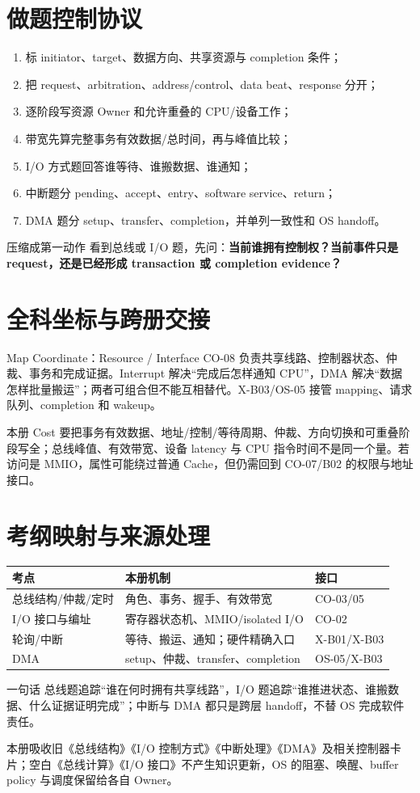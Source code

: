 \documentclass[UTF8,fontset=fandol,11pt,a4paper]{ctexart}
\newcommand{\kw}[1]{\textbf{\color{deep}#1}}
\begin{document}
\section{做题控制协议}
\begin{enumerate}
\item 标 initiator、target、数据方向、共享资源与 completion 条件；
\item 把 request、arbitration、address/control、data beat、response 分开；
\item 逐阶段写资源 Owner 和允许重叠的 CPU/设备工作；
\item 带宽先算完整事务有效数据/总时间，再与峰值比较；
\item I/O 方式题回答谁等待、谁搬数据、谁通知；
\item 中断题分 pending、accept、entry、software service、return；
\item DMA 题分 setup、transfer、completion，并单列一致性和 OS handoff。
\end{enumerate}

\begin{methodbox}{压缩成第一动作}
看到总线或 I/O 题，先问：\kw{当前谁拥有控制权？当前事件只是 request，还是已经形成 transaction 或 completion evidence？}
\end{methodbox}

\section{全科坐标与跨册交接}
\begin{corebox}{Map Coordinate：Resource / Interface}
CO-08 负责共享线路、控制器状态、仲裁、事务和完成证据。Interrupt 解决“完成后怎样通知 CPU”，DMA 解决“数据怎样批量搬运”；两者可组合但不能互相替代。X-B03/OS-05 接管 mapping、请求队列、completion 和 wakeup。
\end{corebox}
本册 Cost 要把事务有效数据、地址/控制/等待周期、仲裁、方向切换和可重叠阶段写全；总线峰值、有效带宽、设备 latency 与 CPU 指令时间不是同一个量。若访问是 MMIO，属性可能绕过普通 Cache，但仍需回到 CO-07/B02 的权限与地址接口。

\section{考纲映射与来源处理}
\begin{center}\small
\begin{tabularx}{\linewidth}{L{3.0cm}YY}\toprule
考点 & 本册机制 & 接口\\\midrule
总线结构/仲裁/定时 & 角色、事务、握手、有效带宽 & CO-03/05\\
I/O 接口与编址 & 寄存器状态机、MMIO/isolated I/O & CO-02\\
轮询/中断 & 等待、搬运、通知；硬件精确入口 & X-B01/X-B03\\
DMA & setup、仲裁、transfer、completion & OS-05/X-B03\\
\bottomrule
\end{tabularx}
\end{center}

\begin{corebox}{一句话}
总线题追踪“谁在何时拥有共享线路”，I/O 题追踪“谁推进状态、谁搬数据、什么证据证明完成”；中断与 DMA 都只是跨层 handoff，不替 OS 完成软件责任。
\end{corebox}

本册吸收旧《总线结构》《I/O 控制方式》《中断处理》《DMA》及相关控制器卡片；空白《总线计算》《I/O 接口》不产生知识更新，OS 的阻塞、唤醒、buffer policy 与调度保留给各自 Owner。
\end{document}
